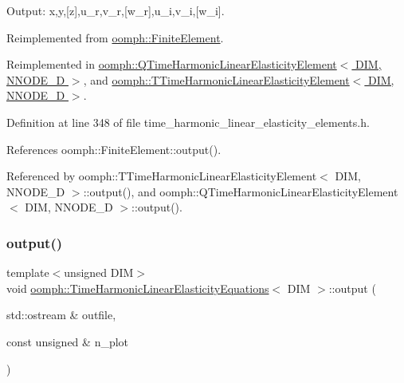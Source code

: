 Output\+: x,y,\mbox{[}z\mbox{]},u\+\_\+r,v\+\_\+r,\mbox{[}w\+\_\+r\mbox{]},u\+\_\+i,v\+\_\+i,\mbox{[}w\+\_\+i\mbox{]}. 



Reimplemented from \hyperlink{classoomph_1_1FiniteElement_a2ad98a3d2ef4999f1bef62c0ff13f2a7}{oomph\+::\+Finite\+Element}.



Reimplemented in \hyperlink{classoomph_1_1QTimeHarmonicLinearElasticityElement_a4d142935a8302780cbfe8fdcd26d4358}{oomph\+::\+Q\+Time\+Harmonic\+Linear\+Elasticity\+Element$<$ D\+I\+M, N\+N\+O\+D\+E\+\_\+D $>$}, and \hyperlink{classoomph_1_1TTimeHarmonicLinearElasticityElement_a5f20fab8c4740f48557380a36b86669b}{oomph\+::\+T\+Time\+Harmonic\+Linear\+Elasticity\+Element$<$ D\+I\+M, N\+N\+O\+D\+E\+\_\+D $>$}.



Definition at line 348 of file time\+\_\+harmonic\+\_\+linear\+\_\+elasticity\+\_\+elements.\+h.



References oomph\+::\+Finite\+Element\+::output().



Referenced by oomph\+::\+T\+Time\+Harmonic\+Linear\+Elasticity\+Element$<$ D\+I\+M, N\+N\+O\+D\+E\+\_\+D $>$\+::output(), and oomph\+::\+Q\+Time\+Harmonic\+Linear\+Elasticity\+Element$<$ D\+I\+M, N\+N\+O\+D\+E\+\_\+D $>$\+::output().

\mbox{\label{classoomph_1_1TimeHarmonicLinearElasticityEquations_a5363121911a4418e2bfa707e02e2adc4}} 
\subsubsection{\texorpdfstring{output()}{output()}\hspace{0.1cm}{\footnotesize\ttfamily [2/4]}}
{\footnotesize\ttfamily template$<$unsigned D\+IM$>$ \\
void \hyperlink{classoomph_1_1TimeHarmonicLinearElasticityEquations}{oomph\+::\+Time\+Harmonic\+Linear\+Elasticity\+Equations}$<$ D\+IM $>$\+::output (\begin{DoxyParamCaption}\item[{std\+::ostream \&}]{outfile,  }\item[{const unsigned \&}]{n\+\_\+plot }\end{DoxyParamCaption})\hspace{0.3cm}{\ttfamily [virtual]}}



